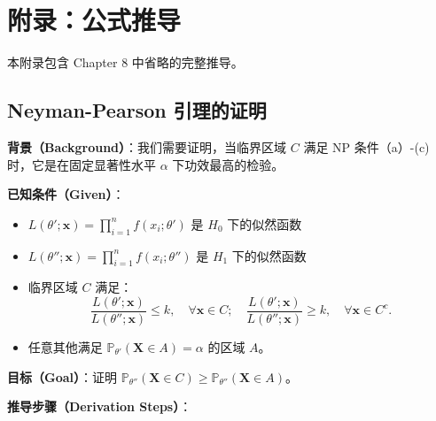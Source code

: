\section*{附录：公式推导}\label{sec:appendix-ch8}

本附录包含 Chapter 8 中省略的完整推导。

\subsection{Neyman-Pearson 引理的证明}\label{sec:np-lemma-proof}

\textbf{背景（Background）}：我们需要证明，当临界区域 $C$ 满足 NP 条件（a）-(c) 时，它是在固定显著性水平 $\alpha$ 下功效最高的检验。

\textbf{已知条件（Given）}：
\begin{itemize}
\item $L(\theta'; \mathbf{x}) = \prod_{i=1}^n f(x_i; \theta')$ 是 $H_0$ 下的似然函数
\item $L(\theta''; \mathbf{x}) = \prod_{i=1}^n f(x_i; \theta'')$ 是 $H_1$ 下的似然函数
\item 临界区域 $C$ 满足：
\[
\frac{L(\theta';\mathbf{x})}{L(\theta'';\mathbf{x})} \leq k, \quad \forall \mathbf{x} \in C;
\quad
\frac{L(\theta';\mathbf{x})}{L(\theta'';\mathbf{x})} \geq k, \quad \forall \mathbf{x} \in C^c.
\]
\item 任意其他满足 $\mathbb{P}_{\theta'}(\mathbf{X} \in A) = \alpha$ 的区域 $A$。
\end{itemize}

\textbf{目标（Goal）}：证明 $\mathbb{P}_{\theta''}(\mathbf{X} \in C) \geq \mathbb{P}_{\theta''}(\mathbf{X} \in A)$。

\textbf{推导步骤（Derivation Steps）}：

